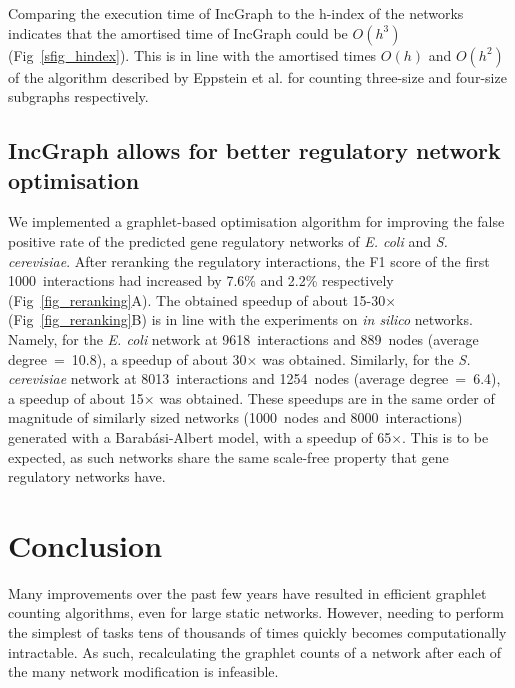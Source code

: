Comparing the execution time of IncGraph to the h-index of the networks indicates that the amortised time of IncGraph could be $O(h^3)$ (Fig~\ref{sfig_hindex}). This is in line with the amortised times $O(h)$ and $O(h^2)$ of the algorithm described by Eppstein et al.\cite{eppstein_extendeddynamicsubgraph_2012} for counting three-size and four-size subgraphs respectively.

\subsection*{IncGraph allows for better regulatory network optimisation}
We implemented a graphlet-based optimisation algorithm for improving the false positive rate of the predicted gene regulatory networks of \textit{E. coli} and \textit{S. cerevisiae}. After reranking the regulatory interactions, the F1 score of the first 1000~interactions had increased by 7.6\% and 2.2\% respectively (Fig~\ref{fig_reranking}A). The obtained speedup of about 15-30$\times$ (Fig~\ref{fig_reranking}B) is in line with the experiments on \textit{in silico} networks.
Namely, for the \textit{E. coli} network at 9618~interactions and 889~nodes (average degree~=~10.8), a speedup of about 30$\times$ was obtained.
Similarly, for the \textit{S. cerevisiae} network at 8013~interactions and 1254~nodes (average degree~=~6.4), a speedup of about 15$\times$ was obtained.
These speedups are in the same order of magnitude of similarly sized networks (1000~nodes and 8000~interactions) generated with a Barab\'asi-Albert model, with a speedup of 65$\times$. This is to be expected, as such networks share the same scale-free property that gene regulatory networks have.



\section*{Conclusion}
Many improvements over the past few years have resulted in efficient graphlet counting algorithms, even for large static networks. However, needing to perform the simplest of tasks tens of thousands of times quickly becomes computationally intractable. As such, recalculating the graphlet counts of a network after each of the many network modification is infeasible.

